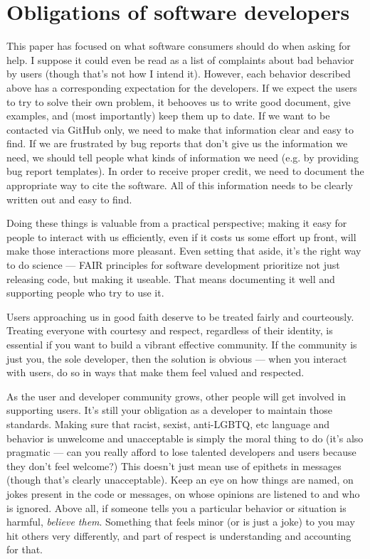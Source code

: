 \documentclass[9pt,training]{livecoms}
\begin{document}
\section{Obligations of software developers}

This paper has focused on what software consumers should do when asking for
help.  I suppose it could even be read as a list of complaints about bad
behavior by users (though that's not how I intend it). However, each behavior
described above has a corresponding expectation for the developers. If we expect
the users to try to solve their own problem, it behooves us to write good
document, give examples, and (most importantly) keep them up to date. If we want
to be contacted via GitHub only, we need to make that information clear and easy
to find. If we are frustrated by bug reports that don't give us the information
we need, we should tell people what kinds of information we need (e.g. by
providing bug report templates). In order to receive proper credit, we need to
document the appropriate way to cite the software. All of this information needs
to be clearly written out and easy to find.

Doing these things is valuable from a practical perspective; making it easy for
people to interact with us efficiently, even if it costs us some effort up
front, will make those interactions more pleasant. Even setting that aside, it's
the right way to do science --- FAIR principles for software development
\cite{Lamprecht-2020} prioritize not just releasing code, but making it useable.
That means documenting it well and supporting people who try to use it.

Users approaching us in good faith deserve to be treated fairly and courteously.
Treating everyone with courtesy and respect, regardless of their identity, is
essential if you want to build a vibrant effective community.  If the community
is just you, the sole developer, then the solution is obvious --- when you
interact with users, do so in ways that make them feel valued and respected.

As the user and developer community grows, other people will get involved in
supporting users. It's still your obligation as a developer to maintain those
standards.  Making sure that racist, sexist, anti-LGBTQ, etc language and
behavior is unwelcome and unacceptable is simply the moral thing to do (it's
also pragmatic --- can you really afford to lose talented developers and users
because they don't feel welcome?) This doesn't just mean use of epithets in
messages (though that's clearly unacceptable). Keep an eye on how things are
named, on jokes present in the code or messages, on whose opinions are listened
to and who is ignored.  Above all, if someone tells you a particular behavior or
situation is harmful, \emph{believe them}.  Something that feels minor (or is
just a joke) to you may hit others very differently, and part of respect is
understanding and accounting for that.
\end{document}
